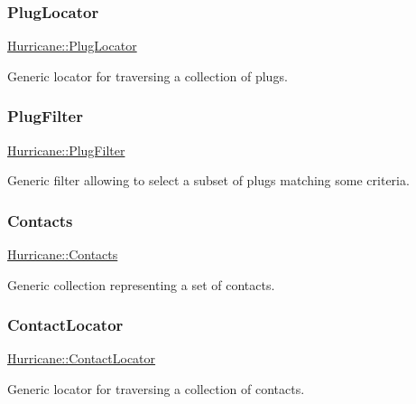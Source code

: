 \subsubsection{\texorpdfstring{Plug\+Locator}{PlugLocator}}
{\footnotesize\ttfamily \mbox{\hyperlink{namespaceHurricane_a99a5e89f593de242e24a24b632b0534e}{Hurricane\+::\+Plug\+Locator}}}

Generic locator for traversing a collection of plugs. \mbox{\label{namespaceHurricane_ad6b0bd4bdff4c52e6163b9f54e3e5c92}} 
\subsubsection{\texorpdfstring{Plug\+Filter}{PlugFilter}}
{\footnotesize\ttfamily \mbox{\hyperlink{namespaceHurricane_ad6b0bd4bdff4c52e6163b9f54e3e5c92}{Hurricane\+::\+Plug\+Filter}}}

Generic filter allowing to select a subset of plugs matching some criteria. \mbox{\label{namespaceHurricane_a1e6a8ab09f688509bd727b3fee02d0d2}} 
\subsubsection{\texorpdfstring{Contacts}{Contacts}}
{\footnotesize\ttfamily \mbox{\hyperlink{namespaceHurricane_a1e6a8ab09f688509bd727b3fee02d0d2}{Hurricane\+::\+Contacts}}}

Generic collection representing a set of contacts. \mbox{\label{namespaceHurricane_a244811a7f36de747884f0c1ab1cc1025}} 
\subsubsection{\texorpdfstring{Contact\+Locator}{ContactLocator}}
{\footnotesize\ttfamily \mbox{\hyperlink{namespaceHurricane_a244811a7f36de747884f0c1ab1cc1025}{Hurricane\+::\+Contact\+Locator}}}

Generic locator for traversing a collection of contacts. \mbox{\label{namespaceHurricane_a57f79232601d8739370debec00f89740}} 
